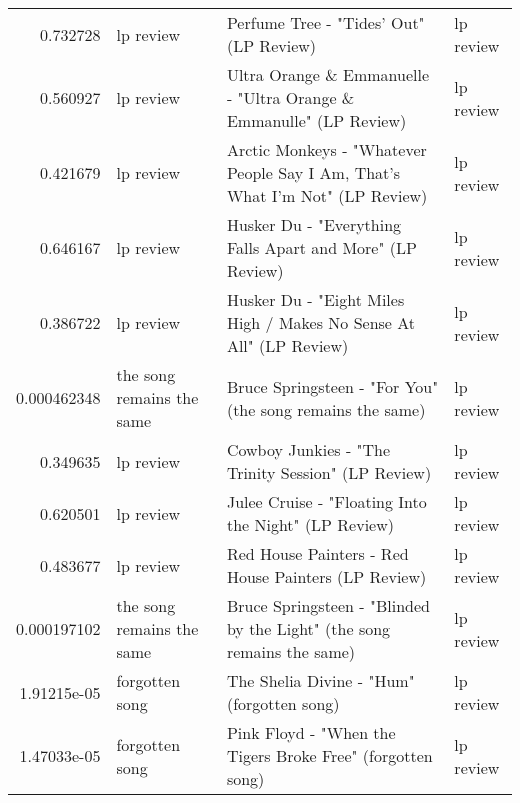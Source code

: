 \documentclass[letterpaper,10pt]{article}
\begin{document}
\begin{table}[H]
\begin{adjustbox}{max width=\linewidth}
\begin{tabular}{rlll}
  0.732728    & lp review                 & Perfume Tree - "Tides' Out" (LP Review)                                                                      & lp review                 \\
  0.560927    & lp review                 & Ultra Orange \& Emmanuelle - "Ultra Orange \& Emmanulle" (LP Review)                                           & lp review                 \\
  0.421679    & lp review                 & Arctic Monkeys - "Whatever People Say I Am, That's What I'm Not" (LP Review)                                 & lp review                 \\
  0.646167    & lp review                 & Husker Du - "Everything Falls Apart and More" (LP Review)                                                    & lp review                 \\
  0.386722    & lp review                 & Husker Du - "Eight Miles High / Makes No Sense At All" (LP Review)                                           & lp review                 \\
  0.000462348 & the song remains the same & Bruce Springsteen - "For You" (the song remains the same)                                                    & lp review                 \\
  0.349635    & lp review                 & Cowboy Junkies - "The Trinity Session" (LP Review)                                                           & lp review                 \\
  0.620501    & lp review                 & Julee Cruise - "Floating Into the Night" (LP Review)                                                         & lp review                 \\
  0.483677    & lp review                 & Red House Painters - Red House Painters (LP Review)                                                          & lp review                 \\
  0.000197102 & the song remains the same & Bruce Springsteen - "Blinded by the Light" (the song remains the same)                                       & lp review                 \\
  1.91215e-05 & forgotten song            & The Shelia Divine - "Hum" (forgotten song)                                                                   & lp review                 \\
  1.47033e-05 & forgotten song            & Pink Floyd - "When the Tigers Broke Free" (forgotten song)                                                   & lp review                 \\

\end{tabular}
\end{adjustbox}
\end{table}
\end{document}
